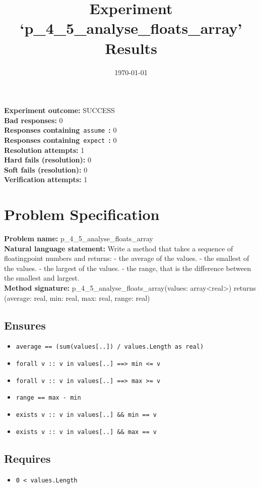 \documentclass{article}
\begin{document}
\title{Experiment `p\_4\_5\_analyse\_floats\_array' Results}
\author{\today}
\date{}
\maketitle
\textbf{Experiment outcome: }SUCCESS
\\\textbf{Bad responses: }0
\\\textbf{Responses containing}~\texttt{assume}~\textbf{: }0
\\\textbf{Responses containing}~\texttt{expect}~\textbf{: }0
\\\textbf{Resolution attempts: }1
\\\textbf{Hard fails (resolution): }0
\\\textbf{Soft fails (resolution): }0
\\\textbf{Verification attempts: }1
\section*{Problem Specification}
\textbf{Problem name: }p\_4\_5\_analyse\_floats\_array
\\\textbf{Natural language statement: }Write a method that takes a sequence of floatingpoint numbers and returns: - the average of the values. - the smallest of the values. - the largest of the values. - the range, that is the difference between the smallest and largest.
\\\textbf{Method signature: }p\_4\_5\_analyse\_floats\_array(values: array<real>) returns (average: real, min: real, max: real, range: real)
\subsection*{Ensures}
\begin{itemize}
\item \texttt{average == (sum(values[..]) / values.Length as real)}
\item \texttt{forall v :: v in values[..] ==> min <= v}
\item \texttt{forall v :: v in values[..] ==> max >= v}
\item \texttt{range == max - min}
\item \texttt{exists v :: v in values[..] \&\& min == v}
\item \texttt{exists v :: v in values[..] \&\& max == v}
\end{itemize}
\subsection*{Requires}
\begin{itemize}
\item \texttt{0 < values.Length}
\end{itemize}
\end{document}
